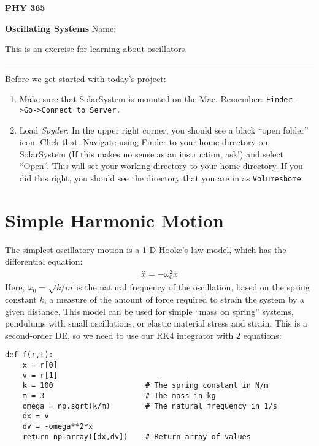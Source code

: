 \documentclass[]{article}
\renewcommand{\ddot}[1]{\overset{\bm{..}}{#1}{}}
\renewcommand{\_}{\char`_}
\newcommand{\bs}{\symbol{92}}
\begin{document}
\pagestyle{empty}

\noindent
{\Large\bf PHY 365}
\vspace{4pt}

\noindent
{\Large\bf Oscillating Systems} \hfill {\large Name:} \hrulefill
\vspace{6pt}

\vspace{11pt}

\noindent This is an exercise for learning about oscillators. 

\medskip\hrule

\medskip
Before we get started with today's project: 
\begin{enumerate}
\item Make sure that SolarSystem is mounted on the Mac. Remember: \texttt{Finder->Go->Connect to Server. }
\item Load \textit{Spyder}. In the upper right corner, you should see a black ``open folder'' icon. Click that. Navigate using Finder to your home directory on SolarSystem (If this makes no sense as an instruction, ask!) and select ``Open''. This will set your working directory to your home directory. If you did this right, you should see the directory that you are in as \texttt{\bs Volumes\bs home}.   
\end{enumerate}

\section{Simple Harmonic Motion}

The simplest oscillatory motion is a 1-D Hooke's law model, which has the differential equation: 
\begin{align*}
\ddot{x} = -\omega_0^2x
\end{align*}
Here, $\omega_0=\sqrt{k/m}$ is the natural frequency of the oscillation, based on the spring constant $k$, a measure of the amount of force required to strain the system by a given distance. This model can be used for simple ``mass on spring'' systems, pendulums with small oscillations, or elastic material stress and strain. This is a second-order DE, so we need to use our RK4 integrator with 2 equations: 
\begin{lstlisting}
def f(r,t):
    x = r[0]                   
    v = r[1]
    k = 100                     # The spring constant in N/m 
    m = 3                       # The mass in kg
    omega = np.sqrt(k/m)        # The natural frequency in 1/s                 
    dx = v                      
    dv = -omega**2*x                     
    return np.array([dx,dv])    # Return array of values
\end{lstlisting}
\end{document}
